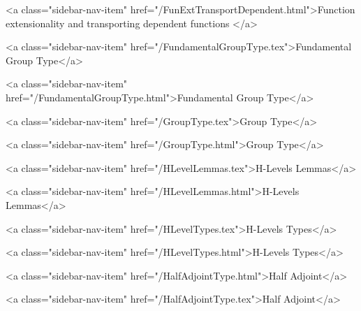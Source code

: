       
        
          <a class="sidebar-nav-item" href="/FunExtTransportDependent.html">Function extensionality and transporting dependent functions </a>
        
      
    
      
        
          <a class="sidebar-nav-item" href="/FundamentalGroupType.tex">Fundamental Group Type</a>
        
      
    
      
        
          <a class="sidebar-nav-item" href="/FundamentalGroupType.html">Fundamental Group Type</a>
        
      
    
      
        
          <a class="sidebar-nav-item" href="/GroupType.tex">Group Type</a>
        
      
    
      
        
          <a class="sidebar-nav-item" href="/GroupType.html">Group Type</a>
        
      
    
      
        
          <a class="sidebar-nav-item" href="/HLevelLemmas.tex">H-Levels Lemmas</a>
        
      
    
      
        
          <a class="sidebar-nav-item" href="/HLevelLemmas.html">H-Levels Lemmas</a>
        
      
    
      
        
          <a class="sidebar-nav-item" href="/HLevelTypes.tex">H-Levels Types</a>
        
      
    
      
        
          <a class="sidebar-nav-item" href="/HLevelTypes.html">H-Levels Types</a>
        
      
    
      
        
          <a class="sidebar-nav-item" href="/HalfAdjointType.html">Half Adjoint</a>
        
      
    
      
        
          <a class="sidebar-nav-item" href="/HalfAdjointType.tex">Half Adjoint</a>
        
